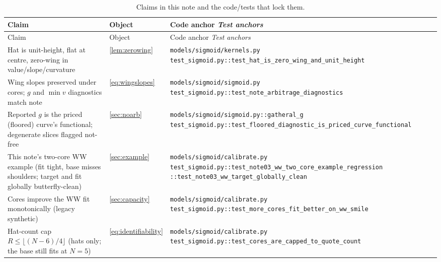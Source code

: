 \documentclass[11pt]{article}
\begin{document}
\begingroup
\small
\setlength{\tabcolsep}{4pt}
\renewcommand{\arraystretch}{1.15}
\begin{longtable}{@{}p{}p{}p{}@{}}
\caption{Claims in this note and the code/tests that lock them.}\\
\toprule Claim & Object & Code anchor \newline \emph{Test anchors}\\ \midrule
\endfirsthead
\toprule Claim & Object & Code anchor \newline \emph{Test anchors}\\ \midrule
\endhead
Hat is unit-height, flat at centre, zero-wing in value/slope/curvature &
\cref{lem:zerowing} &
\nolinkurl{models/sigmoid/kernels.py}\newline
\nolinkurl{test_sigmoid.py::test_hat_is_zero_wing_and_unit_height}\\
\addlinespace
Wing slopes preserved under cores; $g$ and $\min v$ diagnostics match note &
\eqref{eq:wingslopes} &
\nolinkurl{models/sigmoid/sigmoid.py}\newline
\nolinkurl{test_sigmoid.py::test_note_arbitrage_diagnostics}\\
\addlinespace
Reported $g$ is the priced (floored) curve's functional; degenerate slices
flagged not-free &
\cref{sec:noarb} &
\nolinkurl{models/sigmoid/sigmoid.py::gatheral_g}\newline
\nolinkurl{test_sigmoid.py::test_floored_diagnostic_is_priced_curve_functional}\\
\addlinespace
This note's two-core WW example (fit tight, base misses shoulders; target and
fit globally butterfly-clean) &
\cref{sec:example} &
\nolinkurl{models/sigmoid/calibrate.py}\newline
\nolinkurl{test_sigmoid.py::test_note03_ww_two_core_example_regression}\newline
\nolinkurl{::test_note03_ww_target_globally_clean}\\
\addlinespace
Cores improve the WW fit monotonically (legacy synthetic) &
\cref{sec:capacity} &
\nolinkurl{models/sigmoid/calibrate.py}\newline
\nolinkurl{test_sigmoid.py::test_more_cores_fit_better_on_ww_smile}\\
\addlinespace
Hat-count cap $R\le\lfloor(N-6)/4\rfloor$ (hats only; the base still fits at
$N=5$) &
\eqref{eq:identifiability} &
\nolinkurl{models/sigmoid/calibrate.py}\newline
\nolinkurl{test_sigmoid.py::test_cores_are_capped_to_quote_count}\\

\end{longtable}
\end{document}

